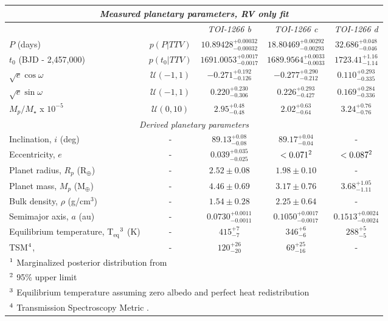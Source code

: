 \begin{table*}
\begin{tabular}{lcccc}
    \multicolumn{5}{c}{\emph{Measured planetary parameters, RV only fit}} \\
    \hline
    && \emph{TOI-1266 b} & \emph{TOI-1266 c} & \emph{TOI-1266 d} \\
    $P$ (days) & $p(P\vert TTV)$ & $10.89428^{+0.00032}_{-0.00032}$ & $18.80469^{+0.00292}_{-0.00293}$ & $32.686^{+0.048}_{-0.046}$ \\
    $t_0$ (BJD - 2,457,000) & $p(t_0\vert TTV)$ & $1691.0053^{+0.0017}_{-0.0017}$ & $1689.9564^{+0.0033}_{-0.0033}$ & $1723.41^{+1.16}_{-1.14}$ \\
    $\sqrt{e}\cos{\omega}$ & $\mathcal{U}(-1,1)$ & $-0.271^{+0.192}_{-0.126}$ & $-0.277^{+0.290}_{-0.212}$ & $0.110^{+0.293}_{-0.335}$ \\
    $\sqrt{e}\sin{\omega}$ & $\mathcal{U}(-1,1)$ & $0.220^{+0.230}_{-0.306}$ & $0.226^{+0.293}_{-0.427}$ & $0.169^{+0.284}_{-0.336}$ \\
    $M_p/M_\star$ x $10^{-5}$ & $\mathcal{U}(0,10)$ & $2.95^{+0.48}_{-0.48}$ & $2.02^{+0.63}_{-0.64}$ & $3.24^{+0.76}_{-0.76}$ \\
    \multicolumn{5}{c}{\emph{Derived planetary parameters}} \\
    \hline
    Inclination, $i$ (deg) &-& $89.13^{+0.08}_{-0.08}$ & $89.17^{+0.04}_{-0.04}$ & - \\
    Eccentricity, $e$ &-& $0.039^{+0.035}_{-0.025}$ & $<0.071^\textsc{2}$ & $<0.087^\textsc{2}$ \\
    Planet radius, $R_{p}$ (R$_{\oplus}$) &-& $2.52\pm 0.08$ & $1.98\pm 0.10$ & - \\
    Planet mass, $M_{p}$ (M$_{\oplus}$) & - & $4.46\pm 0.69$ & $3.17\pm 0.76$ & $3.68^{+1.05}_{-1.11}$ \\ 
    Bulk density, $\rho$ (g/cm$^3$) &-& $1.54\pm 0.28$ & $2.25\pm 0.64$ & - \\
    Semimajor axis, $a$ (au) &-& $0.0730^{+0.0011}_{-0.0011}$ & $0.1050^{+0.0017}_{-0.0017}$ & $0.1513^{+0.0024}_{-0.0024}$ \\
    Equilibrium temperature, T$_{\text{eq}}$$^\textsc{3}$ (K) &-& $415^{+7}_{-7}$ & $346^{+6}_{-6}$ & $288^{+5}_{-5}$ \\
    TSM$^\textsc{4}$, & - & $120^{+26}_{-20}$ & $69^{+25}_{-16}$ & - \\
    \hline
    \multicolumn{5}{l}{\footnotesize{$^\textsc{1}$ Marginalized posterior distribution from \cite{Cloutier_2024}}} \\
    \multicolumn{5}{l}{\footnotesize{$^\textsc{2}$ 95\% upper limit}} \\
    \multicolumn{5}{l}{\footnotesize{$^\textsc{3}$ Equilibrium temperature assuming zero albedo and perfect heat redistribution}} \\
    \multicolumn{5}{l}{\footnotesize{$^\textsc{4}$ Transmission Spectroscopy Metric \citep{Kempton2018}.}} \\
\end{tabular}
\end{table*}
